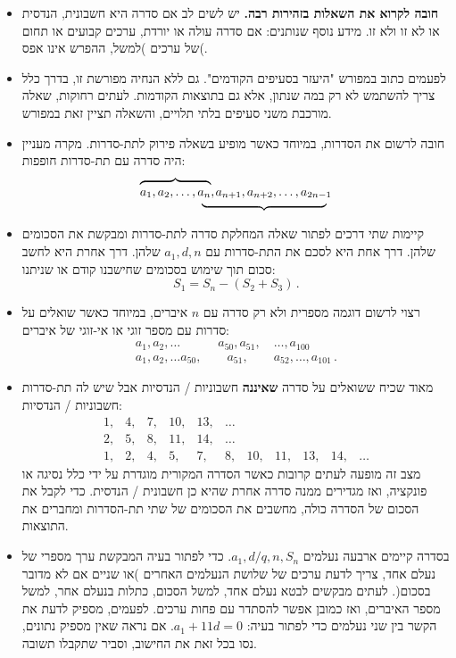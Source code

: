 \documentclass[12pt,a4paper]{article}
\begin{document}
\begin{itemize}
\item
\textbf{חובה לקרוא את השאלות בזהירות רבה.}
יש לשים לב אם סדרה היא חשבונית, הנדסית או לא זו ולא זו. מידע נוסף שנותנים: אם סדרה עולה או יורדת, ערכים קבועים או תחום של ערכים )למשל, ההפרש אינו אפס(.
\item 
לפעמים כתוב במפורש "היעזר בסעיפים הקודמים". גם ללא הנחיה מפורשת זו, בדרך כלל צריך להשתמש לא רק במה שנתון, אלא גם בתוצאות הקודמות. לעתים רחוקות, שאלה מורכבת משני סעיפים בלתי תלויים, והשאלה תציין זאת במפורש.
\item
חובה לרשום את הסדרות, במיוחד כאשר מופיע בשאלה פירוק לתת-סדרות. מקרה מעניין היה סדרה עם תת-סדרות חופפות:
\[
\renewcommand{\arraystretch}{.4}
\begin{array}{ll}
\overbrace{\rule{0pt}{8pt}a_1, a_2, \ldots, a_n},&\hspace{-9pt}a_{n+1}, a_{n+2}, \ldots, a_{2n-1}\\
&\hspace{-2em}\underbrace{\rule{10em}{0pt}}
\end{array}
\]
\vspace{-4ex}
\item
קיימות שתי דרכים לפתור שאלה המחלקת סדרה לתת-סדרות ומבקשת את הסכומים שלהן. דרך אחת היא לסכם את התת-סדרות עם
$a_1, d, n$
שלהן. דרך אחרת היא לחשב סכום תוך שימוש בסכומים שחישבנו קודם או שניתנו:
\[
S_1 = S_n - (S_2+S_3)\,.
\]
\vspace{-6ex}
\item
רצוי לרשום דוגמה מספרית ולא רק סדרה עם 
$n$
איברים, במיוחד כאשר שואלים על סדרות עם מספר זוגי או אי-זוגי של איברים:
\[
\begin{array}{l}
a_1, a_2, \ldots \quad\quad\quad a_{50}, a_{51}, \quad \ldots, a_{100}\\
a_1, a_2, \ldots a_{50}, \quad\quad a_{51}, \quad\quad a_{52}, \ldots, a_{101}\,.
\end{array}
\]
\vspace{-4ex}
\item 
מאוד שכיח ששואלים על סדרה
\textbf{שאיננה}
חשבוניות / הנדסיות אבל שיש לה תת-סדרות חשבוניות / הנדסיות:
\[
\begin{array}{rrrrrrrrrrr}
1,& 4,& 7,& 10,& 13,& \ldots\\
2,& 5,& 8,& 11,& 14, &\ldots\\
1,& 2,& 4,& 5,& 7,& 8,& 10,& 11,& 13,& 14, &\ldots
\end{array}
\]
מצב זה מופעה לעתים קרובות כאשר הסדרה המקורית מוגדרת על ידי כלל נסיגה או פונקציה, ואז מגדירים ממנה סדרה אחרת שהיא כן חשבונית / הנדסית. כדי לקבל את הסכום של הסדרה כולה, מחשבים את הסכומים של שתי תת-הסדרות ומחברים את התוצאות.
\item
בסדרה קיימים ארבעה נעלמים
$a_1, d / q, n, S_n$.
כדי לפתור בעיה המבקשת ערך מספרי של נעלם אחד, צריך לדעת ערכים של שלושת הנעלמים האחרים )או שניים אם לא מדובר בסכום(. לעתים מבקשים לבטא נעלם אחד, למשל הסכום, כתלות בנעלם אחר, למשל מספר האיברים, ואז כמובן אפשר להסתדר עם פחות ערכים. לפעמים, מספיק לדעת את הקשר בין שני נעלמים כדי לפתור בעיה:
$a_1+11d = 0$.
אם נראה שאין מספיק נתונים, נסו בכל זאת את החישוב, וסביר שתקבלו תשובה.

\end{itemize}
\end{document}
